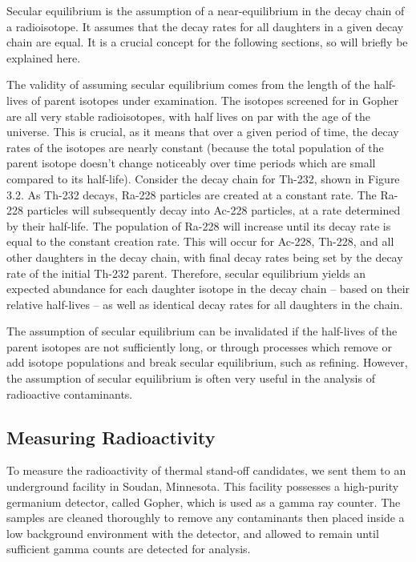 \documentclass{report}
\begin{document}
Secular equilibrium is the assumption of a near-equilibrium in the decay chain of a radioisotope. It assumes that the decay rates for all daughters in a given decay chain are equal. It is a crucial concept for the following sections, so will briefly be explained here.

The validity of assuming secular equilibrium comes from the length of the half-lives of parent isotopes under examination. The isotopes screened for in Gopher are all very stable radioisotopes, with half lives on par with the age of the universe. This is crucial, as it means that over a given period of time, the decay rates of the isotopes are nearly constant (because the total population of the parent isotope doesn't change noticeably over time periods which are small compared to its half-life). Consider the decay chain for Th-232, shown in Figure 3.2. As Th-232 decays, Ra-228 particles are created at a constant rate. The Ra-228 particles will subsequently decay into Ac-228 particles, at a rate determined by their half-life. The population of Ra-228 will increase until its decay rate is equal to the constant creation rate. This will occur for Ac-228, Th-228, and all other daughters in the decay chain, with final decay rates being set by the decay rate of the initial Th-232 parent. Therefore, secular equilibrium yields an expected abundance for each daughter isotope in the decay chain -- based on their relative half-lives -- as well as identical decay rates for all daughters in the chain.

The assumption of secular equilibrium can be invalidated if the half-lives of the parent isotopes are not sufficiently long, or through processes which remove or add isotope populations and break secular equilibrium, such as refining. However, the assumption of secular equilibrium is often very useful in the analysis of radioactive contaminants.


\subsection{Measuring Radioactivity}
To measure the radioactivity of thermal stand-off candidates, we sent them to an underground facility in Soudan, Minnesota. This facility possesses a high-purity germanium detector, called Gopher, which is used as a gamma ray counter. The samples are cleaned thoroughly to remove any contaminants then placed inside a low background environment with the detector, and allowed to remain until sufficient gamma counts are detected for analysis.
\end{document}
